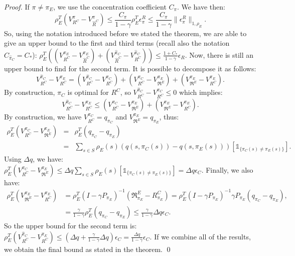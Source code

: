 \documentclass{llncs}
\begin{document}
\begin{proof}
If $\pi\neq\pi_E$, we use the concentration coefficient $C_\pi$. We have then:
\begin{equation}
  \rho_E^T(V^{\pi}_{R^C}-V^{\pi}_{\hat{R}^C})\leq\frac{C_\pi}{1-\gamma}\rho_E^T\epsilon^R_{\pi}\leq\frac{C_\pi}{1-\gamma}\|\epsilon^R_{\pi}\|_{1,\rho_E}.
  \end{equation}
So, using the notation introduced before we stated the theorem, we are able to give an upper bound to the first and third terms (recall also the notation $C_{\hat \pi_C} = C_*$):
$\rho_E^T((V^{\pi_E}_{R^C}-V^{\pi_E}_{\hat{R}^C})+(V^{\hat{\pi}_C}_{\hat{R}^C}-V^{\hat{\pi}_C}_{R^C}))\leq\frac{1+C_*}{1-\gamma}\epsilon_R$.
Now, there is still an upper bound to find for the second term. It is possible to decompose it as follows:
\begin{equation}
V^{\hat{\pi}_C}_{R^C}-V^{\pi_E}_{R^C}=(V^{\hat{\pi}_C}_{R^C}-V^{\pi_C}_{R^C})+(V^{\pi_C}_{R^C}-V^{\pi_E}_{\mathfrak{R}^E})+(V^{\pi_E}_{\mathfrak{R}^E}-V^{\pi_E}_{R^C}).
\end{equation}
By construction, $\pi_C$ is optimal for $R^C$, so $V^{\hat{\pi}_C}_{R^C}-V^{\pi_C}_{R^C}\leq0$ which implies:
\begin{equation}
V^{\hat{\pi}_C}_{R^C}-V^{\pi_E}_{R^C}\leq(V^{\pi_C}_{R^C}-V^{\pi_E}_{\mathfrak{R}^E})+(V^{\pi_E}_{\mathfrak{R}^E}-V^{\pi_E}_{R^C}).
\end{equation}
By construction, we have $V^{\pi_C}_{R^C}=q_{\pi_C}$ and $V^{\pi_E}_{\mathfrak{R}^E}=q_{\pi_E}$, thus:
\begin{eqnarray}
\rho_E^T(V^{\pi_C}_{R^C}-V^{\pi_E}_{\mathfrak{R}^E})&=&\rho_E^T(q_{\pi_C}-q_{\pi_E})\\
&=&\sum_{s\in S}\rho_E(s)(q(s,\pi_C(s))-q(s,\pi_E(s)))[\mathds{1}_{\{\pi_C(s)\neq\pi_E(s)\}}].
\end{eqnarray}
Using $\Delta q$, we have:
$\rho_E^T(V^{\pi_C}_{R^C}-V^{\pi_E}_{\mathfrak{R}^E})\leq\Delta q\sum_{s\in S}\rho_E(s)[\mathds{1}_{\{\pi_C(s)\neq\pi_E(s)\}}]= \Delta q \epsilon_C$.
Finally, we also have:
\begin{align}
\rho_E^T(V^{\pi_E}_{\mathfrak{R}^E}-V^{\pi_E}_{R^C})&=\rho_E^T(I-\gamma P_{\pi_E})^{-1}(\mathfrak{R}^E_{\pi_E}-R^C_{\pi_E})=\rho_E^T(I-\gamma P_{\pi_E})^{-1}\gamma P_{\pi_E}(q_{\pi_C}-q_{\pi_E}),
\\
&=\frac{\gamma}{1-\gamma}\rho_E^T(q_{\pi_C}-q_{\pi_E})\leq \frac{\gamma}{1-\gamma}\Delta q \epsilon_C.
\end{align}
So the upper bound for the second term is: $\rho_E^T(V^{\hat{\pi}_C}_{R^C}-V^{\pi_E}_{R^C})\leq (\Delta q +\frac{\gamma}{1-\gamma}\Delta q) \epsilon_C =   \frac{\Delta q}{1-\gamma}\epsilon_C$.
If we combine all of the results, we obtain the final bound as stated in the theorem.
\qed
\end{proof}
\end{document}
